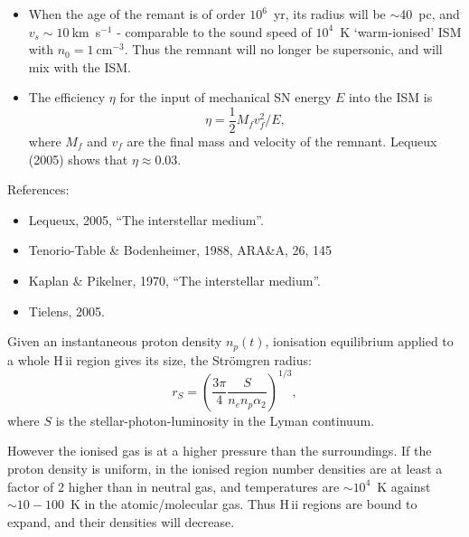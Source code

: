 
\begin{itemize}

\item When the age of the remant is of order $10^6$~yr, its radius
  will be $\sim$40~pc, and $v_s \sim 10~$km~s$^{-1}$ - comparable to
  the sound speed of $10^4$~K `warm-ionised' ISM with $n_0 =
  1~$cm$^{-3}$. Thus the remnant will no longer be supersonic, and
  will mix with the ISM. 

\item The efficiency $\eta$ for the input of mechanical SN energy $E$
  into the ISM is 
\[ \eta = \frac{1}{2} M_f v_f^2  / E  , \]
where $M_f$ and $v_f$ are the final mass and velocity of the
remnant. Lequeux (2005) shows that $\eta \approx 0.03$.

\end{itemize}




References: 

\begin{itemize}

\item Lequeux,  2005, ``The interstellar medium''.
\item Tenorio-Table \& Bodenheimer, 1988, ARA\&A, 26, 145
\item Kaplan \& Pikelner, 1970, ``The interstellar medium''.
\item Tielens, 2005. 
\end{itemize}



Given an instantaneous proton density $n_p(t)$, ionisation equilibrium
applied to a whole H\,{\sc ii} region gives its size, the
Str\"omgren radius:
\begin{equation}
r_S = \left( \frac{3 \pi}{4}  \frac{S}{n_e n_p \alpha_2}
\right)^{1/3}, 
\end{equation}
where $S$ is the stellar-photon-luminosity in the Lyman continuum.

However the ionised gas is at a higher pressure than the
surroundings. If the proton density is uniform, in the ionised region
number densities are at least a factor of 2 higher than in neutral
gas, and temperatures are $\sim 10^4$~K against $\sim 10-100$~K in
the atomic/molecular gas. Thus H\,{\sc ii} regions are bound to
expand, and their densities will decrease. 


